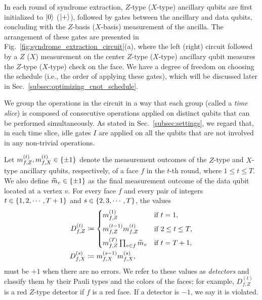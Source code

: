 \documentclass[a4paper,twocolumn,11pt,accepted=2025-01-21]{quantumarticle}
\theoremstyle{definition}
\theoremstyle{definition}
\theoremstyle{definition}
\begin{document}
In each round of syndrome extraction, $Z$-type ($X$-type) ancillary qubits are first initialized to $\ket{0}$ ($\ket{+}$), followed by \cnot gates between the ancillary and data qubits, concluding with the $Z$-basis ($X$-basis) measurement of the ancilla.
The arrangement of these \cnot gates are presented in Fig.~\ref{fig:syndrome_extraction_circuit}(a), where the left (right) circuit followed by a $Z$ ($X$) measurement on the center $Z$-type ($X$-type) ancillary qubit measures the $Z$-type ($X$-type) check on the face.
We have a degree of freedom on choosing the \cnot schedule (i.e., the order of applying these \cnot gates), which will be discussed later in Sec.~\ref{subsec:optimizing_cnot_schedule}.

We group the operations in the circuit in a way that each group (called a \emph{time slice}) is composed of consecutive operations applied on distinct qubits that can be performed simultaneously.
As stated in Sec.~\ref{subsec:settings}, we regard that, in each time slice, idle gates $I$ are applied on all the qubits that are not involved in any non-trivial operations.

Let $m_{f,Z}^{(t)}, m_{f,X}^{(t)} \in \qty{\pm 1}$ denote the measurement outcomes of the $Z$-type and $X$-type ancillary qubits, respectively, of a face $f$ in the $t$-th round, where $1 \leq t \leq T$.
We also define $\widetilde{m}_{v} \in \qty{\pm 1}$ as the final measurement outcome of the data qubit located at a vertex $v$.
For every face $f$ and every pair of integers $t \in \qty{1, 2, \cdots, T+1}$ and $s \in \qty{2, 3, \cdots, T}$, the values
\begin{subequations}
\begin{align}
    D_{f,Z}^{(t)} &\coloneqq \begin{cases}
        m_{f,Z}^{(1)} & \text{if } t = 1, \\[0.5em]
        m_{f,Z}^{(t-1)} m_{f,Z}^{(t)} & \text{if } 2 \leq t \leq T, \\[0.5em]
        m_{f,Z}^{(T)} \prod_{v \in f} \widetilde{m}_{v} & \text{if } t = T + 1,
    \end{cases} \label{eq:Z_type_detector}\\
    D_{f,X}^{(s)} &\coloneqq m_{f,X}^{(s-1)} m_{f,X}^{(s)}, \label{eq:X_type_detector}
\end{align}
\label{eq:detectors}
\end{subequations}
must be $+1$ when there are no errors.
We refer to these values as \emph{detectors} and classify them by their Pauli types and the colors of the faces; for example, $D_{f,Z}^{(t)}$ is a red $Z$-type detector if $f$ is a red face.
If a detector is $-1$, we say it is violated.
\end{document}
